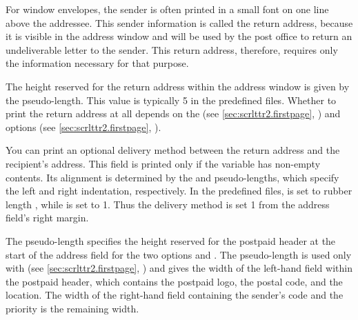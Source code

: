 \begin{Declaration}
\end{Declaration}
For window envelopes, the sender is often printed in a small font on one line
above the addressee. This sender information is called the return
address, because it is visible
in the address window and will be used by the post office to return an
undeliverable letter to the sender. This return address, therefore, requires
only the information necessary for that purpose.

The height reserved for the return address within the address window is given
by the  pseudo-length. This value is typically
5 in the predefined  files. Whether to print the return address
at all depends on the  (see
\autoref{sec:scrlttr2.firstpage}, ) and
 options (see
\autoref{sec:scrlttr2.firstpage}, ).%
\EndIndexGroup


\begin{Declaration}
\end{Declaration}
You can print an optional delivery method between the return address and the
recipient's address. This field is printed only if the
 variable has non-empty contents. Its
alignment is determined by the  and
 pseudo-lengths, which specify the left and
right indentation, respectively. In the predefined 
files,
 is set to rubber length , while
 is set to 1. Thus the delivery
method is set 1 from the address field's right margin.%
\EndIndexGroup


\begin{Declaration}
\end{Declaration}
The  pseudo-length
specifies the height reserved for the postpaid header at the start of the
address field for the two options
%
 and
%
. The
 pseudo-length is used only with
 (see
\autoref{sec:scrlttr2.firstpage}, ) and
gives the width of the left-hand field within the postpaid header, which
contains the postpaid logo, the postal code, and the location. The width of
the right-hand field containing the sender's code and the priority is the
remaining width.

